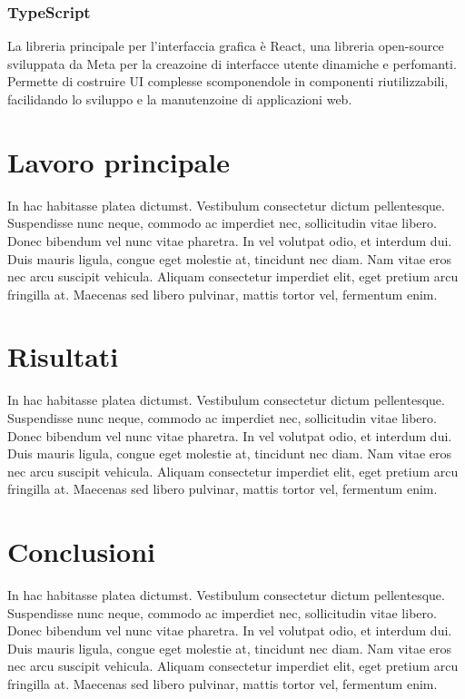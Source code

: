 \documentclass[target=bach,aauheader=,style=]{thud}
\begin{document}
\subsection{TypeScript}
La libreria principale per l'interfaccia grafica è React, una libreria open-source sviluppata da Meta per la creazoine di interfacce utente dinamiche e perfomanti. 
Permette di costruire UI complesse scomponendole in componenti riutilizzabili, facilidando lo sviluppo e la manutenzoine di applicazioni web.

\chapter{Lavoro principale}
In hac habitasse platea dictumst. Vestibulum consectetur dictum pellentesque. Suspendisse nunc neque, commodo ac imperdiet nec, sollicitudin vitae libero. Donec bibendum vel nunc vitae pharetra. In vel volutpat odio, et interdum dui. Duis mauris ligula, congue eget molestie at, tincidunt nec diam. Nam vitae eros nec arcu suscipit vehicula. Aliquam consectetur imperdiet elit, eget pretium arcu fringilla at. Maecenas \cite{Knu86} sed libero pulvinar, mattis tortor vel, fermentum enim.


\chapter{Risultati}
In hac habitasse platea dictumst. Vestibulum consectetur dictum pellentesque. Suspendisse nunc neque, commodo ac imperdiet nec, sollicitudin vitae libero. Donec bibendum vel nunc vitae pharetra. In vel volutpat odio, et interdum dui. Duis mauris ligula, congue eget molestie at, tincidunt nec diam. Nam vitae eros nec arcu suscipit vehicula. Aliquam consectetur imperdiet elit, eget pretium arcu fringilla at. Maecenas \cite{Knu86} sed libero pulvinar, mattis tortor vel, fermentum enim.


\chapter{Conclusioni}
In hac habitasse platea dictumst. Vestibulum consectetur dictum pellentesque. Suspendisse nunc neque, commodo ac imperdiet nec, sollicitudin vitae libero. Donec bibendum vel nunc vitae pharetra. In vel volutpat odio, et interdum dui. Duis mauris ligula, congue eget molestie at, tincidunt nec diam. Nam vitae eros nec arcu suscipit vehicula. Aliquam consectetur imperdiet elit, eget pretium arcu fringilla at. Maecenas \cite{Knu86} sed libero pulvinar, mattis tortor vel, fermentum enim.
\end{document}
